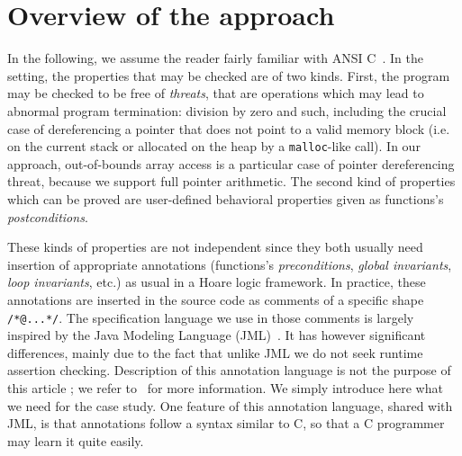\section{Overview of the \caduceus{} approach}
\label{sec:overview}

In the following, we assume the reader fairly familiar with ANSI
C~\cite{KR88}.  In the \caduceus{} setting, the properties that may be
checked are of two kinds. First, the program may be checked to be free
of \emph{threats}, that are operations which may lead to abnormal
program termination: division by zero and such, including the crucial
case of dereferencing a pointer that does not point to a valid memory
block (i.e. on the current stack or allocated on the heap by a
\texttt{malloc}-like call). In our approach, out-of-bounds array
access is a particular case of pointer dereferencing threat, because
we support full pointer arithmetic.  The second kind of properties
which can be proved are user-defined behavioral properties given as
functions's \emph{postconditions}.

These kinds of properties are not independent since they both usually
need insertion of appropriate annotations (functions's
\emph{preconditions}, \emph{global invariants}, \emph{loop
  invariants}, etc.) as usual in a Hoare logic framework.  In
practice, these annotations are inserted in the source code as
comments of a specific shape \verb!/*@...*/!. The specification
language we use in those comments is largely inspired by the Java
Modeling Language (JML)~\cite{leavens00jml}. It has however
significant differences, mainly due to the fact that unlike JML we do
not seek runtime assertion checking. Description of this annotation
language is not the purpose of this article ; we refer
to~\cite{Caduceus,filliatre04icfem} for more information. We simply
introduce here what we need for the case study.  One feature of this
annotation language, shared with JML, is that annotations follow
a syntax similar to C, so that a C programmer may learn it
quite easily.
 

